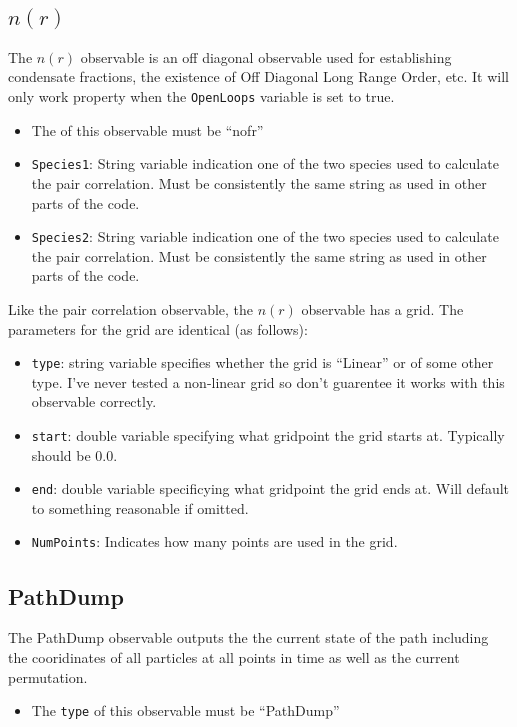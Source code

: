\documentclass{book}
\begin{document}
\subsection{$n(r)$}
The $n(r)$ observable is an off diagonal observable used for
establishing condensate fractions, the existence of Off Diagonal Long
Range Order, etc. It will only work property when the \texttt{OpenLoops}
variable is set to true.
\begin{itemize}
\item The  of this observable must be ``nofr''
\item \texttt{Species1}: String variable indication one of the two species used to calculate the
  pair correlation. Must be consistently the same string as used in
  other parts of the code.
\item \texttt{Species2}: String variable indication one of the two species used to calculate the
  pair correlation. Must be consistently the same string as used in
  other parts of the code.
\end{itemize}
Like the pair correlation observable, the $n(r)$ observable has a
grid. The parameters for the grid are identical (as follows):
\begin{itemize}
\item \texttt{type}: string variable specifies whether the grid is
  ``Linear'' or of some other type. I've never tested a non-linear
  grid so don't guarentee it works with this observable correctly.
\item \texttt{start}: double variable specifying what gridpoint the grid
  starts at. Typically should be 0.0.
\item \texttt{end}: double variable specificying what gridpoint the
  grid ends at. Will default to something reasonable if omitted.
\item \texttt{NumPoints}: Indicates how many points are used in the grid.
\end{itemize}
\subsection{PathDump}
The PathDump observable outputs the the current state of the path
including the cooridinates of all particles at all points in time as
well as the current permutation.  
\begin{itemize}
\item The \texttt{type} of this observable must be ``PathDump''
\end{itemize}
\end{document}

